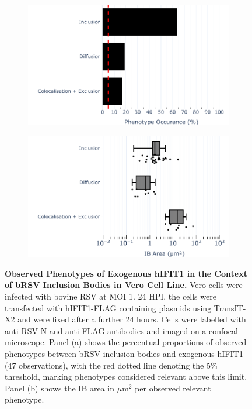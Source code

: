 \begin{figure}
    \begin{subfigure}{0.495\textwidth}
        \caption{}
        \includegraphics[width=1\linewidth]{09. Chapter 4/Figs/02. Overexpression/01. IFIT1/04. bar_i1_brsv.pdf} 
    \end{subfigure}
    \begin{subfigure}{0.495\textwidth}
        \caption{}
        \includegraphics[width=1\linewidth]{09. Chapter 4/Figs/02. Overexpression/01. IFIT1/05. box_i1_brsv.pdf}
    \end{subfigure}
    \caption[Observed Phenotypes of Exogenous hIFIT1 in the Context of bRSV Inclusion Bodies in Vero Cell Line.]{\textbf{Observed Phenotypes of Exogenous hIFIT1 in the Context of bRSV Inclusion Bodies in Vero Cell Line.} Vero cells were infected with bovine RSV at MOI 1. 24 HPI, the cells were transfected with hIFIT1-FLAG containing plasmids using TransIT-X2 and were fixed after a further 24 hours. Cells were labelled with anti-RSV N and anti-FLAG antibodies and imaged on a confocal microscope. Panel (a) shows the percentual proportions of observed phenotypes between bRSV inclusion bodies and exogenous hIFIT1 (47 observations), with the red dotted line denoting the 5\% threshold, marking phenotypes considered relevant above this limit. Panel (b) shows the IB area in \(\mu \mbox{m}^2\) per observed relevant phenotype.}
    \label{fig:Observed Phenotypes of Exogenous hIFIT1 in the Context of bRSV Inclusion Bodies in VERO Cell Line}
\end{figure}

